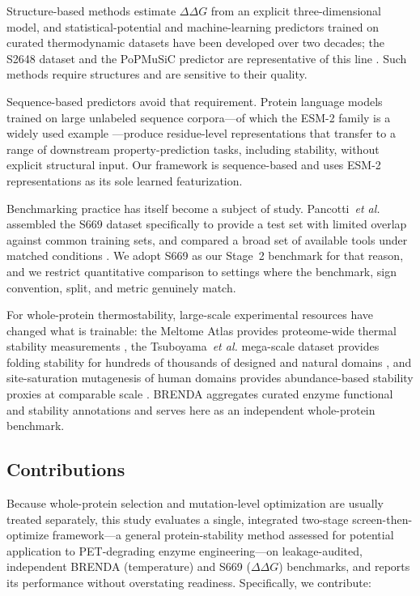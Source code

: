 \documentclass[journal,article,submit,moreauthors]{Definitions/mdpi}
\newcommand{\ddg}{\ensuremath{\Delta\Delta G}}
\begin{document}
Structure-based methods estimate \ddg{} from an explicit three-dimensional model, and
statistical-potential and machine-learning predictors trained on curated thermodynamic
datasets have been developed over two decades; the S2648 dataset and the PoPMuSiC
predictor are representative of this line \citep{dehouck2009s2648}. Such methods require
structures and are sensitive to their quality.

Sequence-based predictors avoid that requirement. Protein language models trained on large
unlabeled sequence corpora---of which the ESM-2 family is a widely used example
\citep{lin2023esm2}---produce residue-level representations that transfer to a range of
downstream property-prediction tasks, including stability, without explicit structural
input. Our framework is sequence-based and uses ESM-2 representations as its sole learned
featurization.

Benchmarking practice has itself become a subject of study. Pancotti~\textit{et al.}
assembled the S669 dataset specifically to provide a test set with limited overlap against
common training sets, and compared a broad set of available tools under matched conditions
\citep{pancotti2022s669}. We adopt S669 as our Stage~2 benchmark for that reason, and we
restrict quantitative comparison to settings where the benchmark, sign convention, split,
and metric genuinely match.

For whole-protein thermostability, large-scale experimental resources have changed what is
trainable: the Meltome Atlas provides proteome-wide thermal stability measurements
\citep{jarzab2020meltome}, the Tsuboyama~\textit{et al.} mega-scale dataset provides
folding stability for hundreds of thousands of designed and natural domains
\citep{tsuboyama2023}, and site-saturation mutagenesis of human domains provides
abundance-based stability proxies at comparable scale \citep{beltran2025domainome}. BRENDA
aggregates curated enzyme functional and stability annotations \citep{chang2021brenda} and
serves here as an independent whole-protein benchmark.

\subsection{Contributions}

Because whole-protein selection and mutation-level optimization are usually treated
separately, this study evaluates a single, integrated two-stage screen-then-optimize
framework---a general protein-stability method assessed for potential application to
PET-degrading enzyme engineering---on leakage-audited, independent BRENDA (temperature) and
S669 (\ddg) benchmarks, and reports its performance without overstating readiness.
Specifically, we contribute:
\end{document}
